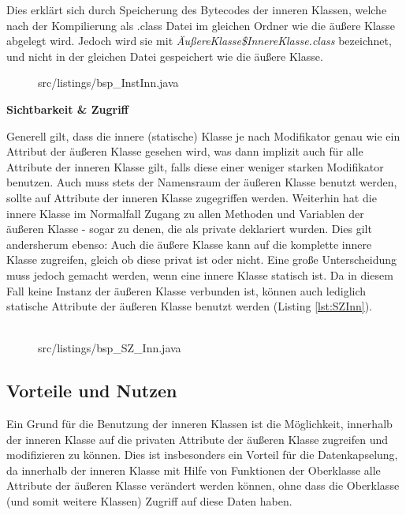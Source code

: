 Dies erklärt sich durch Speicherung des Bytecodes der inneren Klassen, welche nach
der Kompilierung als .class Datei im gleichen Ordner wie die äußere Klasse abgelegt
wird. Jedoch wird sie mit {\it ÄußereKlasse\$InnereKlasse.class} bezeichnet, und nicht in der gleichen Datei
gespeichert wie die äußere Klasse.

\begin{figure}[hbt]
\lstset{language=Java}
 {src/listings/bsp_InstInn.java}
\end{figure}

{\bf Sichtbarkeit \& Zugriff}

Generell gilt, dass die innere (statische) Klasse je nach Modifikator genau wie ein Attribut der äußeren Klasse gesehen wird, was dann implizit auch für alle Attribute der inneren Klasse gilt, falls diese einer weniger starken Modifikator benutzen.
Auch muss stets der Namensraum der äußeren Klasse benutzt werden, sollte auf Attribute der inneren Klasse zugegriffen werden.
Weiterhin hat die innere Klasse im Normalfall Zugang zu allen Methoden und Variablen der äußeren Klasse - sogar zu denen, die als private deklariert wurden.
Dies gilt andersherum ebenso: Auch die äußere Klasse kann auf die komplette innere Klasse zugreifen, gleich ob diese privat ist oder nicht.
Eine große Unterscheidung muss jedoch gemacht werden, wenn eine innere Klasse statisch ist. Da in diesem Fall keine Instanz der äußeren Klasse verbunden ist, können auch lediglich statische Attribute der äußeren Klasse benutzt werden (Listing \ref{lst:SZInn}).
\\
\\
\begin{figure}[hbt]
\lstset{language=Java}
 {src/listings/bsp_SZ_Inn.java}
\end{figure}

\subsection{Vorteile und Nutzen}

Ein Grund für die Benutzung der inneren Klassen ist die Möglichkeit, innerhalb der inneren Klasse auf die privaten Attribute der äußeren Klasse zugreifen und modifizieren zu können.
Dies ist insbesonders ein Vorteil für die Datenkapselung, da innerhalb der inneren Klasse mit Hilfe von Funktionen der Oberklasse alle Attribute der äußeren Klasse verändert werden können, ohne dass die Oberklasse (und somit weitere Klassen) Zugriff auf diese Daten haben.

